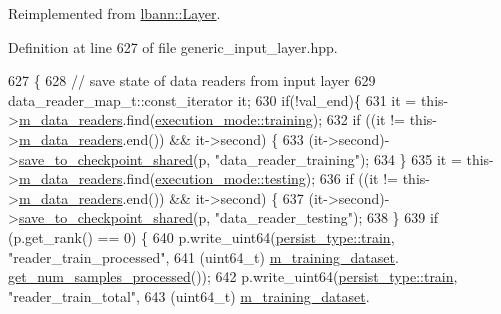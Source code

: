 Reimplemented from \hyperlink{classlbann_1_1Layer_afce0efa0f1c8f3b1c61069536b2fa8cc}{lbann\+::\+Layer}.



Definition at line 627 of file generic\+\_\+input\+\_\+layer.\+hpp.


\begin{DoxyCode}
627                                                                           \{
628     \textcolor{comment}{// save state of data readers from input layer}
629     data\_reader\_map\_t::const\_iterator it;
630     \textcolor{keywordflow}{if}(!val\_end)\{
631       it = this->\hyperlink{classlbann_1_1generic__input__layer_a6bc18860c02beed0252ea3cc87bc48d2}{m\_data\_readers}.find(\hyperlink{base_8hpp_a2781a159088df64ed7d47cc91c4dc0a8ac185ddac8b5a8f5aa23c5b80bc12d214}{execution\_mode::training});
632       \textcolor{keywordflow}{if} ((it != this->\hyperlink{classlbann_1_1generic__input__layer_a6bc18860c02beed0252ea3cc87bc48d2}{m\_data\_readers}.end()) && it->second) \{
633         (it->second)->\hyperlink{classlbann_1_1generic__input__layer_abae61e13f47205491a43e4842808945d}{save\_to\_checkpoint\_shared}(p, \textcolor{stringliteral}{"data\_reader\_training"});
634       \}
635       it = this->\hyperlink{classlbann_1_1generic__input__layer_a6bc18860c02beed0252ea3cc87bc48d2}{m\_data\_readers}.find(\hyperlink{base_8hpp_a2781a159088df64ed7d47cc91c4dc0a8aae2b1fca515949e5d54fb22b8ed95575}{execution\_mode::testing});
636       \textcolor{keywordflow}{if} ((it != this->\hyperlink{classlbann_1_1generic__input__layer_a6bc18860c02beed0252ea3cc87bc48d2}{m\_data\_readers}.end()) && it->second) \{
637         (it->second)->\hyperlink{classlbann_1_1generic__input__layer_abae61e13f47205491a43e4842808945d}{save\_to\_checkpoint\_shared}(p, \textcolor{stringliteral}{"data\_reader\_testing"});
638       \}
639       \textcolor{keywordflow}{if} (p.get\_rank() == 0) \{
640         p.write\_uint64(\hyperlink{namespacelbann_adee41f31f15f3906cbdcce4a1417eb56a61b3a8faa9c1091806675c230a9abe64}{persist\_type::train}, \textcolor{stringliteral}{"reader\_train\_processed"},
641                        (uint64\_t) \hyperlink{classlbann_1_1generic__input__layer_a23716635b1062bfe57f7fcf75140a63a}{m\_training\_dataset}.
      \hyperlink{classlbann_1_1dataset_a73496347a477a5ebb0dbf30140295026}{get\_num\_samples\_processed}());
642         p.write\_uint64(\hyperlink{namespacelbann_adee41f31f15f3906cbdcce4a1417eb56a61b3a8faa9c1091806675c230a9abe64}{persist\_type::train}, \textcolor{stringliteral}{"reader\_train\_total"},
643                        (uint64\_t) \hyperlink{classlbann_1_1generic__input__layer_a23716635b1062bfe57f7fcf75140a63a}{m\_training\_dataset}.

\end{DoxyCode}
